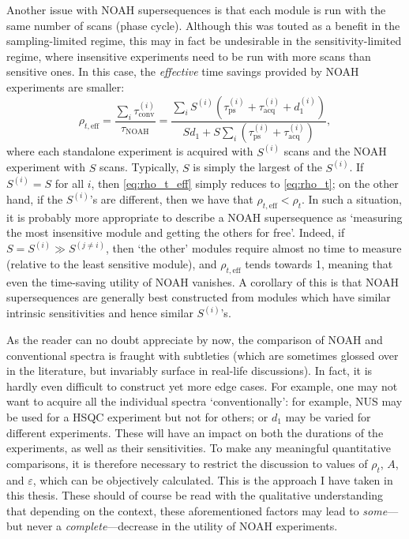 Another issue with NOAH supersequences is that each module is run with the same number of scans (phase cycle).
Although this was touted as a benefit in the sampling-limited regime, this may in fact be undesirable in the sensitivity-limited regime, where insensitive experiments need to be run with more scans than sensitive ones.
In this case, the \textit{effective} time savings provided by NOAH experiments are smaller:
\begin{equation}
    \label{eq:rho_t_eff}
    \rho_{t,\text{eff}}
    = \frac{\sum_i \tau_\text{conv}^{(i)}}{\tau_\text{NOAH}}
    = \frac{{\sum_i S^{(i)}(\tau_\text{ps}^{(i)} + \tau_\text{acq}^{(i)} + d_1^{(i)})}}{Sd_1 + S\sum_i (\tau_\text{ps}^{(i)} + \tau_\text{acq}^{(i)})},
\end{equation}
where each standalone experiment is acquired with $S^{(i)}$ scans and the NOAH experiment with $S$ scans.
Typically, $S$ is simply the largest of the $S^{(i)}$.
If $S^{(i)} = S$ for all $i$, then \cref{eq:rho_t_eff} simply reduces to \cref{eq:rho_t}; on the other hand, if the $S^{(i)}$'s are different, then we have that $\rho_{t,\text{eff}} < \rho_t$.
In such a situation, it is probably more appropriate to describe a NOAH supersequence as `measuring the most insensitive module and getting the others for free'.
Indeed, if $S = S^{(i)} \gg S^{(j\neq i)}$, then `the other' modules require almost no time to measure (relative to the least sensitive module), and $\rho_{t,\text{eff}}$ tends towards 1, meaning that even the time-saving utility of NOAH vanishes.
A corollary of this is that NOAH supersequences are generally best constructed from modules which have similar intrinsic sensitivities and hence similar $S^{(i)}$'s.

As the reader can no doubt appreciate by now, the comparison of NOAH and conventional spectra is fraught with subtleties (which are sometimes glossed over in the literature, but invariably surface in real-life discussions).
In fact, it is hardly even difficult to construct yet more edge cases.
For example, one may not want to acquire all the individual spectra `conventionally': for example, NUS may be used for a HSQC experiment but not for others; or $d_1$ may be varied for different experiments.
These will have an impact on both the durations of the experiments, as well as their sensitivities.
To make any meaningful quantitative comparisons, it is therefore necessary to restrict the discussion to values of $\rho_t$, $A$, and $\varepsilon$, which can be objectively calculated.
This is the approach I have taken in this thesis.
These should of course be read with the qualitative understanding that depending on the context, these aforementioned factors may lead to \textit{some}---but never a \textit{complete}---decrease in the utility of NOAH experiments.
